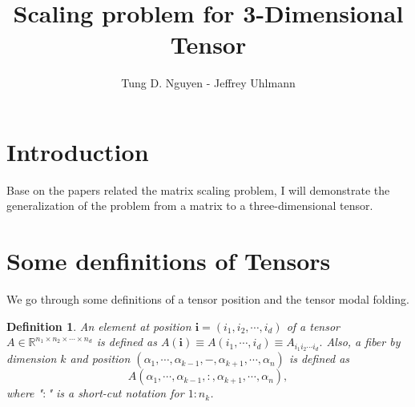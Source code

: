 \documentclass{article}
\title{Scaling problem for 3-Dimensional Tensor}
\author{Tung D. Nguyen - Jeffrey Uhlmann}
\newtheorem{definition}{Definition}[section]
\begin{document}
\maketitle
\section{Introduction}
Base on the papers related the matrix scaling problem, I will demonstrate the generalization of the problem from a matrix to a three-dimensional tensor. 


\section{Some denfinitions of Tensors}
We go through some definitions of a tensor position and the tensor modal folding.

\begin{definition} An element at position $\textbf{i} = (i_1, i_2, \cdots, i_d)$ of a tensor $A \in \mathbb{R}^{n_1 \times n_2 \times \cdots \times n_d}$ is defined as $A(\textbf{i}) \equiv A(i_1, \cdots, i_d) \equiv A_{i_1i_2\cdots i_d}.$ Also, a fiber by dimension $k$ and position $(\alpha_1, \cdots, \alpha_{k-1}, -, \alpha_{k+1}, \cdots, \alpha_n)$ is defined as 
$$A(\alpha_1, \cdots, \alpha_{k-1}, :, \alpha_{k+1}, \cdots, \alpha_n),$$ where "$:$" is a short-cut notation for $1:n_k$. 
\end{definition}{}
\end{document}
